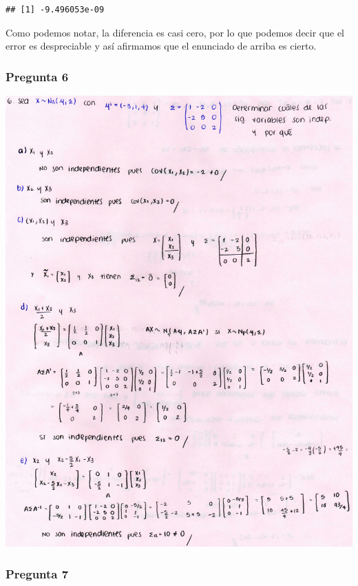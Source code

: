 \documentclass[
]{article}
\begin{document}
\begin{verbatim}
## [1] -9.496053e-09
\end{verbatim}

Como podemos notar, la diferencia es casi cero, por lo que podemos decir
que el error es despreciable y así afirmamos que el enunciado de arriba
es cierto.

\hypertarget{pregunta-6}{%
\subsubsection{\texorpdfstring{\textbf{Pregunta
6}}{Pregunta 6}}\label{pregunta-6}}

\includegraphics{6.jpg}

\hypertarget{pregunta-7}{%
\subsubsection{\texorpdfstring{\textbf{Pregunta
7}}{Pregunta 7}}\label{pregunta-7}}
\end{document}
